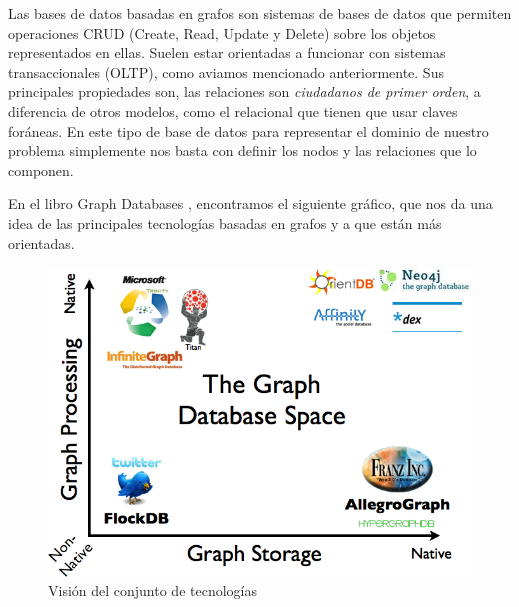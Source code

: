 \documentclass[12pt]{article} %
\begin{document}
\noindent{}

Las bases de datos basadas en grafos son sistemas de bases de datos que permiten operaciones CRUD (Create, Read, Update y Delete) sobre los objetos representados en ellas. Suelen estar orientadas a funcionar con sistemas transaccionales (OLTP), como aviamos mencionado anteriormente. Sus principales propiedades son, las relaciones son \textit{ciudadanos de primer orden}, a diferencia de otros modelos, como el relacional que tienen que usar claves foráneas. En este tipo de base de datos para representar el dominio de nuestro problema simplemente nos basta con definir los nodos y las relaciones que lo componen.

En el libro Graph Databases \cite{graphdbbook}, encontramos el siguiente gráfico, que nos da una idea de las principales tecnologías basadas en grafos y a que están más orientadas.

\begin{figure}[ht!]
\center
\includegraphics{add/grdb.png}
\caption{Visión del conjunto de tecnologías}
\label{fig:grdb}
\end{figure}
\end{document}
